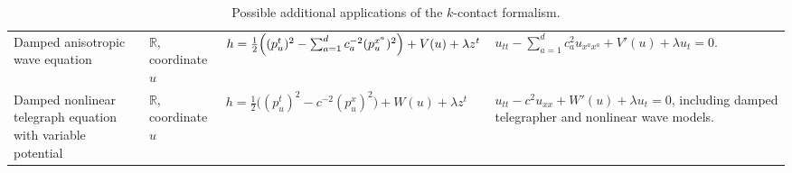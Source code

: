 \documentclass[11pt,a4paper]{article}
\theoremstyle{plain} \newtheorem{theorem}{Theorem}[section] \newtheorem{proposition}[theorem]{Proposition} \newtheorem{corollary}[theorem]{Corollary} \newtheorem{lemma}[theorem]{Lemma} \theoremstyle{definition} \newtheorem{definition}[theorem]{Definition} \theoremstyle{remark} \newtheorem{remark}[theorem]{Remark} \newtheorem{example}[theorem]{Example} %
\begin{document}
\begin{table}[t]
\begin{tabularx}{\textwidth}{@{}L{2.9cm}L{2.6cm}L{5.7cm}X@{}}
Damped anisotropic wave equation
&
$\mathbb{R}$, coordinate $u$
&
$h=\frac12\Bigl((p_u^t)^2-\sum_{a=1}^d c_a^{-2} (p_u^{x^a})^2\Bigr)+V(u)+\lambda z^t$
&
$u_{tt}-\sum_{a=1}^d c_a^2u_{x^ax^a}+V'(u)+\lambda u_t=0$.
\\

Damped nonlinear telegraph equation with variable potential
&
$\mathbb{R}$, coordinate $u$
&
$h=\frac12\bigl((p_u^t)^2-c^{-2}(p_u^x)^2\bigr)+W(u)+\lambda z^t$
&
$u_{tt}-c^2u_{xx}+W'(u)+\lambda u_t=0$,
including damped telegrapher and nonlinear wave models.
\\
\bottomrule
\end{tabularx}
\caption{Possible additional applications of the $k$-contact formalism.}
\label{tab:kcontact_applications_II}
\end{table}


 
\FloatBarrier
\printbibliography
\end{document}
